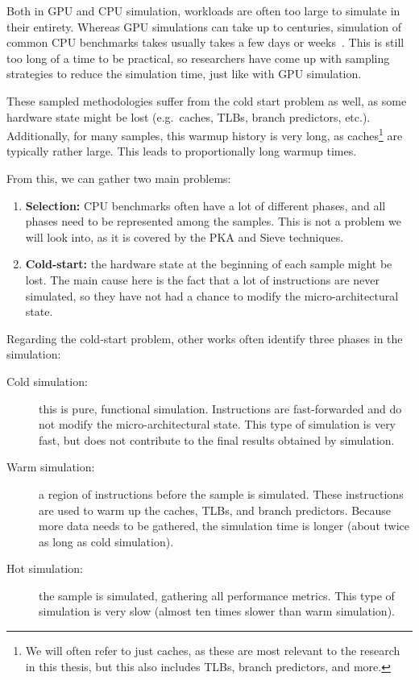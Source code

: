Both in GPU and CPU simulation, workloads are often too large to simulate in their entirety.
Whereas GPU simulations can take up to centuries, simulation of common CPU benchmarks takes usually takes a few days or weeks~\cite{blrl}.
This is still too long of a time to be practical, so researchers have come up with sampling strategies to reduce the simulation time, just like with GPU simulation.

These sampled methodologies suffer from the cold start problem as well, as some hardware state might be lost (e.g.\ caches, TLBs, branch predictors, etc.).
Additionally, for many samples, this warmup history is very long, as caches\footnote{We will often refer to just caches, as these are most relevant to the research in this thesis, but this also includes TLBs, branch predictors, and more.} are typically rather large.
This leads to proportionally long warmup times.

From this, we can gather two main problems:
\begin{enumerate}
    \item \textbf{Selection:} CPU benchmarks often have a lot of different phases, and all phases need to be represented among the samples.
    This is not a problem we will look into, as it is covered by the PKA and Sieve techniques.
    \item \textbf{Cold-start:} the hardware state at the beginning of each sample might be lost.
    The main cause here is the fact that a lot of instructions are never simulated, so they have not had a chance to modify the micro-architectural state.
\end{enumerate}

Regarding the cold-start problem, other works often identify three phases in the simulation:
\begin{description}
    \item[Cold simulation:] this is pure, functional simulation.
    Instructions are fast-forwarded and do not modify the micro-architectural state.
    This type of simulation is very fast, but does not contribute to the final results obtained by simulation.
    \item[Warm simulation:] a region of instructions before the sample is simulated.
    These instructions are used to warm up the caches, TLBs, and branch predictors.
    Because more data needs to be gathered, the simulation time is longer (about twice as long as cold simulation).
    \item[Hot simulation:] the sample is simulated, gathering all performance metrics.
    This type of simulation is very slow (almost ten times slower than warm simulation).
\end{description}

